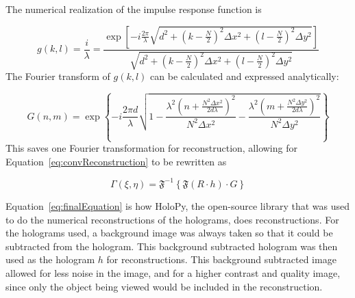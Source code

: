     The numerical realization of the impulse response function is

    \begin{equation}
        g(k,l)=\frac{i}{\lambda}=\frac{\exp\left[
        -i\frac{2\pi}{\lambda}\sqrt{d^2+\left(k-\frac{N}{2}\right)^2\Delta x^2+\left(
        l-\frac{N}{2}
    \right)^{2}\Delta y^2} \right]}{\sqrt{d^2+\left(k-\frac{N}{2}\right)^2\Delta x^2+\left(
        l-\frac{N}{2}
    \right)^{2}\Delta y^2}}
    \end{equation}
    The Fourier transform of $g(k,l)$ can be calculated and expressed
    analytically:

    \begin{equation}
        G(n,m) = \exp\left\{ -i\frac{2\pi
        d}{\lambda}\sqrt{1-\frac{\lambda^{2}\left( n+\frac{N^2\Delta
        x^2}{2d\lambda} \right)^2}{N^2\Delta x^2}-\frac{\lambda^{2}\left( m+\frac{N^2\Delta
        y^2}{2d\lambda} \right)^2}{N^2\Delta y^2}} \right\}
    \end{equation}
    This saves one Fourier transformation for reconstruction, allowing for
    Equation~\ref{eq:convReconstruction} to be rewritten as

    \begin{equation}
        \Gamma(\xi,\eta) = \mathfrak{F}^{-1}\left\{ \mathfrak{F}(R\cdot h)
        \cdot G \right\}
        \label{eq:finalEquation}
    \end{equation}

    Equation~\ref{eq:finalEquation} is how HoloPy, the open-source library that
    was used to do the numerical reconstructions of the holograms, does
    reconstructions. For the holograms used, a background image was always
    taken so that it could be subtracted from the hologram. This background
    subtracted hologram was then used as the hologram $h$ for reconstructions.
    This background subtracted image allowed for less noise in the image, and
    for a higher contrast and quality image, since only the object being viewed
    would be included in the reconstruction.








%
%

% 
